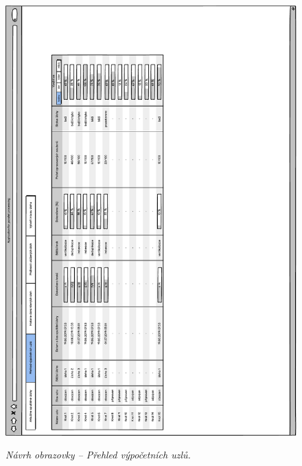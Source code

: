 \begin{figure}[H]
\begin{center}
    \scalebox{0.78}
    {   
        \includegraphics{images/wireframe_appendix_nodeOverview.pdf}
    }
    \caption{\label{obr:wireframe_appendix_nodeOverview} {\it Návrh obrazovky -- Přehled výpočetních uzlů.}}
\end{center}
\end{figure}


